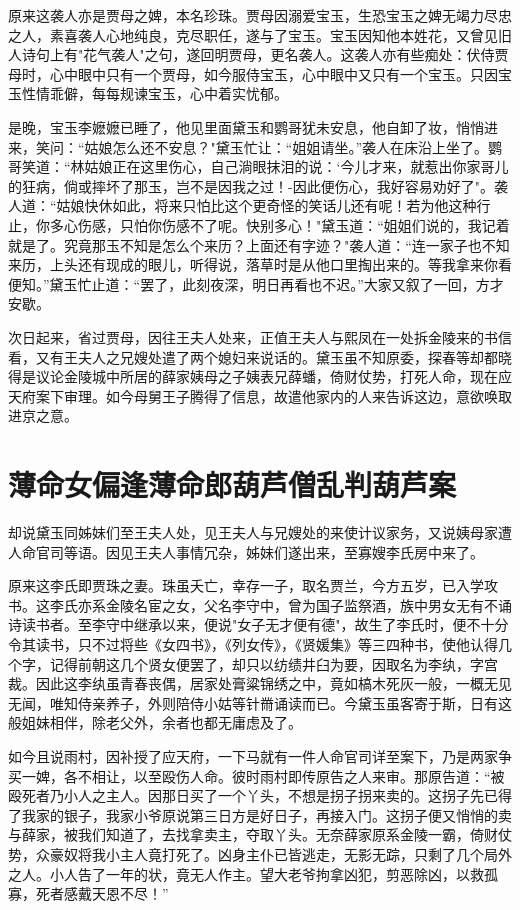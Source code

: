 原来这袭人亦是贾母之婢，本名珍珠。贾母因溺爱宝玉，生恐宝玉之婢无竭力尽忠之人，素喜袭人心地纯良，克尽职任，遂与了宝玉。宝玉因知他本姓花，又曾见旧人诗句上有"花气袭人"之句，遂回明贾母，更名袭人。这袭人亦有些痴处：伏侍贾母时，心中眼中只有一个贾母，如今服侍宝玉，心中眼中又只有一个宝玉。只因宝玉性情乖僻，每每规谏宝玉，心中着实忧郁。

是晚，宝玉李嬷嬷已睡了，他见里面黛玉和鹦哥犹未安息，他自卸了妆，悄悄进来，笑问：“姑娘怎么还不安息？"黛玉忙让：“姐姐请坐。”袭人在床沿上坐了。鹦哥笑道：“林姑娘正在这里伤心，自己淌眼抹泪的说：`今儿才来，就惹出你家哥儿的狂病，倘或摔坏了那玉，岂不是因我之过！-因此便伤心，我好容易劝好了"。袭人道：“姑娘快休如此，将来只怕比这个更奇怪的笑话儿还有呢！若为他这种行止，你多心伤感，只怕你伤感不了呢。快别多心！"黛玉道：“姐姐们说的，我记着就是了。究竟那玉不知是怎么个来历？上面还有字迹？"袭人道：“连一家子也不知来历，上头还有现成的眼儿，听得说，落草时是从他口里掏出来的。等我拿来你看便知。”黛玉忙止道：“罢了，此刻夜深，明日再看也不迟。”大家又叙了一回，方才安歇。

次日起来，省过贾母，因往王夫人处来，正值王夫人与熙凤在一处拆金陵来的书信看，又有王夫人之兄嫂处遣了两个媳妇来说话的。黛玉虽不知原委，探春等却都晓得是议论金陵城中所居的薛家姨母之子姨表兄薛蟠，倚财仗势，打死人命，现在应天府案下审理。如今母舅王子腾得了信息，故遣他家内的人来告诉这边，意欲唤取进京之意。

\chapter{薄命女偏逢薄命郎\ttlbreak 葫芦僧乱判葫芦案}

却说黛玉同姊妹们至王夫人处，见王夫人与兄嫂处的来使计议家务，又说姨母家遭人命官司等语。因见王夫人事情冗杂，姊妹们遂出来，至寡嫂李氏房中来了。

原来这李氏即贾珠之妻。珠虽夭亡，幸存一子，取名贾兰，今方五岁，已入学攻书。这李氏亦系金陵名宦之女，父名李守中，曾为国子监祭酒，族中男女无有不诵诗读书者。至李守中继承以来，便说"女子无才便有德"，故生了李氏时，便不十分令其读书，只不过将些《女四书》，《列女传》，《贤媛集》等三四种书，使他认得几个字，记得前朝这几个贤女便罢了，却只以纺绩井臼为要，因取名为李纨，字宫裁。因此这李纨虽青春丧偶，居家处膏粱锦绣之中，竟如槁木死灰一般，一概无见无闻，唯知侍亲养子，外则陪侍小姑等针黹诵读而已。今黛玉虽客寄于斯，日有这般姐妹相伴，除老父外，余者也都无庸虑及了。

如今且说雨村，因补授了应天府，一下马就有一件人命官司详至案下，乃是两家争买一婢，各不相让，以至殴伤人命。彼时雨村即传原告之人来审。那原告道：“被殴死者乃小人之主人。因那日买了一个丫头，不想是拐子拐来卖的。这拐子先已得了我家的银子，我家小爷原说第三日方是好日子，再接入门。这拐子便又悄悄的卖与薛家，被我们知道了，去找拿卖主，夺取丫头。无奈薛家原系金陵一霸，倚财仗势，众豪奴将我小主人竟打死了。凶身主仆已皆逃走，无影无踪，只剩了几个局外之人。小人告了一年的状，竟无人作主。望大老爷拘拿凶犯，剪恶除凶，以救孤寡，死者感戴天恩不尽！”

